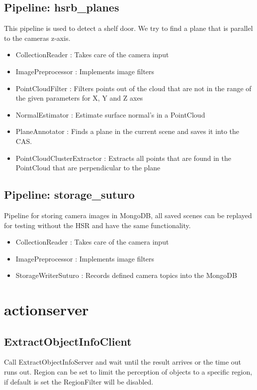 \documentclass[main.tex]{subfiles}
\begin{document}
			\subsection{Pipeline: hsrb\_planes} 
This pipeline is used to detect a shelf door. We try to find a plane that is parallel to the cameras z-axis.
\begin{itemize}
	\item CollectionReader : Takes care of the camera input
	\item ImagePreprocessor : Implements image filters  
	\item PointCloudFilter : Filters points out of the cloud that are not in the range of the given parameters for X, Y and Z axes
	\item NormalEstimator : Estimate surface normal's in a PointCloud 
	\item PlaneAnnotator : Finds a plane in the current scene and saves it into the CAS.
	\item PointCloudClusterExtractor : Extracts all points that are found in the PointCloud that are perpendicular to the plane 
\end{itemize}

			\subsection{Pipeline: storage\_suturo} 
Pipeline for storing camera images in MongoDB, all saved scenes can be replayed for testing without the HSR and have the same functionality. 
\begin{itemize}
	\item CollectionReader : Takes care of the camera input
	\item ImagePreprocessor : Implements image filters 
	\item StorageWriterSuturo :  Records defined camera topics into the MongoDB
\end{itemize}

		\section{actionserver}

			\subsection{ExtractObjectInfoClient}
Call ExtractObjectInfoServer and wait until the result arrives or the time out runs out. Region can be set to limit the perception of objects to a specific region, if default is set the RegionFilter will be disabled. 
\end{document}
